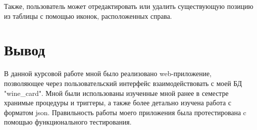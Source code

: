 Также, пользователь может отредактировать или удалить существующую позицию из таблицы с помощью иконок, расположенных справа.

\section{Вывод}
В данной курсовой работе мной было реализовано web-приложение, позволяющее через пользовательский интерфейс взаимодействовать с моей БД "wine\_card". Мной были использованы
изученные мной ранее в семестре хранимые процедуры и триггеры, а также более детально
изучена работа с форматом json.
Правильность работы моего приложения была протестирована c помощью функционального тестирования.

